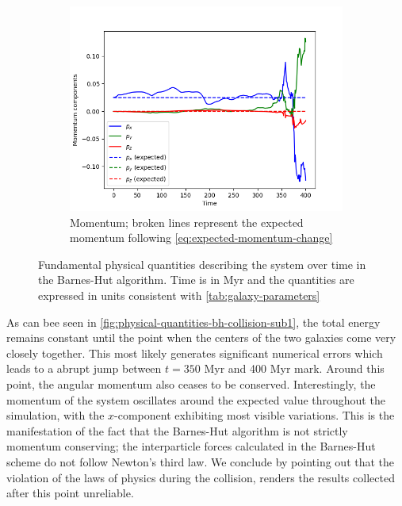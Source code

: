 \begin{figure}[htp]
    \vspace{0.2cm}

    \begin{subfigure}[b]{0.45\textwidth}
        \centering
        \includegraphics[width=\textwidth]{chapters/results/img/bh-collision/momentum.png}
        \caption{Momentum; broken lines represent the expected momentum following \autoref{eq:expected-momentum-change}}
        \label{fig:physical-quantities-bh-collision-sub3}
    \end{subfigure}

    \caption{Fundamental physical quantities describing the system over time in the Barnes-Hut algorithm.
        Time is in Myr and the quantities are expressed in units consistent with \autoref{tab:galaxy-parameters}}
    \label{fig:physical-quantities-bh-collision}
\end{figure}

As can bee seen in \autoref{fig:physical-quantities-bh-collision-sub1}, the total energy remains constant until the point when the centers of the two galaxies come very closely together.
This most likely generates significant numerical errors which leads to a abrupt jump between $t=350$ Myr and 400 Myr mark.
Around this point, the angular momentum also ceases to be conserved.
Interestingly, the momentum of the system oscillates around the expected value throughout the simulation, with the $x$-component exhibiting most visible variations.
This is the manifestation of the fact that the Barnes-Hut algorithm is not strictly momentum conserving;
the interparticle forces calculated in the Barnes-Hut scheme do not follow Newton's third law.
We conclude by pointing out that the violation of the laws of physics during the collision, renders the results collected after this point unreliable.

